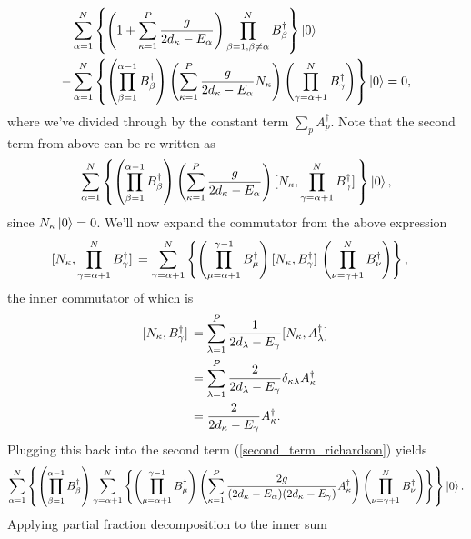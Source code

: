 \documentclass[10pt]{article}
\begin{document}
\begin{align}
\label{richardson_schrodinger_satisfied}
&\sum_{\alpha=1}^N
\left\{
\left(1+\sum_{\kappa=1}^P\frac{g}{2d_\kappa-E_\alpha}\right)
\prod_{\beta=1,\beta\neq\alpha}^NB^\dagger_\beta
\right\}
\ket{0}
\nonumber
\\
-&
\sum_{\alpha=1}^N
\left\{
\left(\prod_{\beta=1}^{\alpha-1}B^\dagger_\beta\right)
\left(
\sum_{\kappa=1}^P\frac{g}{2d_\kappa-E_\alpha}N_\kappa
\right)
\left(\prod_{\gamma=\alpha+1}^NB^\dagger_\gamma\right)
\right\}
\ket{0}
=0
,\end{align}
where we've divided through by the constant term $\sum_pA^\dagger_p$.
Note that the second term from above can be re-written as
\begin{align}
\label{second_term_richardson}
\sum_{\alpha=1}^N
\left\{
\left(\prod_{\beta=1}^{\alpha-1}B^\dagger_\beta\right)
\left(
\sum_{\kappa=1}^P\frac{g}{2d_\kappa-E_\alpha}
\right)
\comm*{N_\kappa}{\prod_{\gamma=\alpha+1}^NB^\dagger_\gamma}
\right\}
\ket{0}
,\end{align}
since $N_\kappa\ket{0}=0$. We'll now expand the commutator from the above expression
\begin{align}
\comm*{N_\kappa}{\prod_{\gamma=\alpha+1}^NB^\dagger_\gamma}
&=
\sum_{\gamma=\alpha+1}^N
\left\{
\left(\prod_{\mu=\alpha+1}^{\gamma-1} B^\dagger_\mu\right)
\comm*{N_\kappa}{B^\dagger_\gamma}
\left(\prod_{\nu=\gamma+1}^NB^\dagger_\nu\right)
\right\}
,\end{align}
the inner commutator of which is
\begin{align}
\comm*{N_\kappa}{B^\dagger_\gamma}
&=
\sum_{\lambda=1}^P\frac{1}{2d_\lambda-E_\gamma}
\comm*{N_\kappa}{A^\dagger_\lambda}
\\
&=
\sum_{\lambda=1}^P\frac{2}{2d_\lambda-E_\gamma}
\delta_{\kappa\lambda}A^\dagger_\kappa
\\
&=
\frac{2}{2d_\kappa-E_\gamma}
A^\dagger_\kappa.
\end{align}
Plugging this back into the second term (\ref{second_term_richardson}) yields
\begin{align}
\label{second_term_richardson3}
\sum_{\alpha=1}^N
\left\{
\left(\prod_{\beta=1}^{\alpha-1}B^\dagger_\beta\right)
\sum_{\gamma=\alpha+1}^N
\left\{
\left(\prod_{\mu=\alpha+1}^{\gamma-1} B^\dagger_\mu\right)
\left(
\sum_{\kappa=1}^P
\frac{2g}{(2d_\kappa-E_\alpha)(2d_\kappa-E_\gamma)}
A^\dagger_\kappa
\right)
\left(\prod_{\nu=\gamma+1}^NB^\dagger_\nu\right)
\right\}
\right\}
\ket{0}
.\end{align}
Applying partial fraction decomposition to the inner sum
\end{document}
